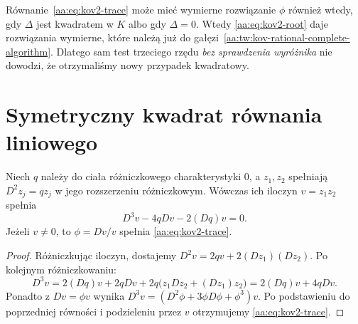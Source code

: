 \begin{uwaga}
\label{aa:uw:kov2-quadratic-versus-rational}
Równanie~\eqref{aa:eq:kov2-trace}
może mieć wymierne rozwiązanie
$\phi$ również wtedy, gdy
$\Delta$ jest kwadratem w $K$
albo gdy $\Delta=0$.
Wtedy
\eqref{aa:eq:kov2-root}
daje rozwiązania wymierne,
które należą już do
gałęzi~\ref{aa:tw:kov-rational-complete-algorithm}.
Dlatego sam test trzeciego
rzędu \emph{bez sprawdzenia
wyróżnika} nie dowodzi,
że otrzymaliśmy nowy
przypadek kwadratowy.
\end{uwaga}

\section{Symetryczny kwadrat równania liniowego}

\begin{lemat}
\label{aa:lem:kov2-symmetric-square}
Niech $q$ należy do
ciała różniczkowego charakterystyki
$0$, a $z_1,z_2$ spełniają
$D^2z_j=qz_j$ w jego
rozszerzeniu różniczkowym.
Wówczas ich iloczyn
$v=z_1z_2$ spełnia
\begin{equation}\label{aa:eq:kov2-third-order}
 D^3v-4qDv-2(Dq)v=0.
\end{equation}
Jeżeli $v\ne0$, to
$\phi=Dv/v$ spełnia
\eqref{aa:eq:kov2-trace}.
\end{lemat}
\begin{proof}
Różniczkując iloczyn,
dostajemy
$D^2v=2qv+2(Dz_1)(Dz_2)$.
Po kolejnym różniczkowaniu:
\[
 D^3v=2(Dq)v+2qDv
 +2q\bigl(z_1Dz_2+(Dz_1)z_2\bigr)
 =2(Dq)v+4qDv.
\]
Ponadto z $Dv=\phi v$ wynika
$D^3v=(D^2\phi+3\phi D\phi
+\phi^3)v$.
Po podstawieniu do poprzedniej
równości i podzieleniu
przez $v$ otrzymujemy
\eqref{aa:eq:kov2-trace}.
\end{proof}

